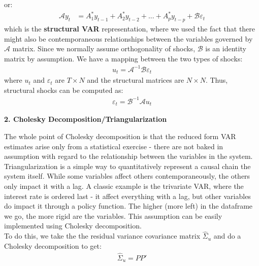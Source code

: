 \documentclass[a4paper, 12pt]{article}
\begin{document}
or:
\begin{equation}
\begin{aligned}
\mathcal{A}y_{t} &=A^*_1 y_{t-1}+A^*_2 y_{t-2}+...+A^*_p y_{t-p}+\mathcal{B}\varepsilon_t \nonumber
\end{aligned}
\end{equation}
which is the \textbf{structural VAR} representation, where we used the fact that there might also be contemporaneous relationships between the variables governed by $\mathcal{A}$ matrix. Since we normally assume orthogonality of shocks, $\mathcal{B}$ is an identity matrix by assumption. 
We have a mapping between the two types of shocks:
\begin{equation}
\begin{aligned}
u_t=\mathcal{A}^{-1}\mathcal{B}\varepsilon_t\nonumber
\end{aligned}
\end{equation}
where $u_t$ and $\varepsilon_t$ are $T\times N$ and the structural matrices are $N\times N$. Thus, structural shocks can be computed as:
\begin{equation}
\begin{aligned}
\varepsilon_t=\mathcal{B}^{-1}\mathcal{A}u_t\nonumber
\end{aligned}
\end{equation}
\begin{center}
\textbf{2. Cholesky Decomposition/Triangularization}
\end{center}
The whole point of Cholesky decomposition is that the reduced form VAR estimates arise only from a statistical exercise - there are not baked in assumption with regard to the
relationship between the variables in the system. Triangularization is a simple way to quantitatively represent a causal chain the system itself. While some variables affect others contemporaneously, the others only impact it with a lag. 
A classic example is the trivariate VAR, where the interest rate is ordered last - it affect everything with a lag, but other variables do impact it through a policy function. The higher (more left) in the dataframe we go, the more rigid are the variables.  
This assumption can be easily implemented using Cholesky decomposition.\\[12pt]
To do this, we take the the residual variance covariance matrix $\hat{\Sigma}_u$ and do a Cholesky decomposition to get:
\begin{equation}
\begin{aligned}
\hat{\Sigma}_u=PP'\nonumber
\end{aligned}
\end{equation}
\end{document}
